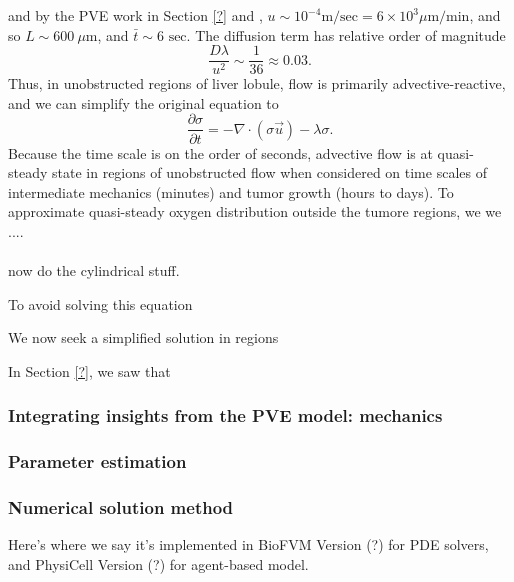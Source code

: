\documentclass[smallextended,natbib]{svjour3}
\newcommand{\beq}{\begin{equation}}
\newcommand{\eeq}{\end{equation}}
\newcommand{\micron}{\mu\textrm{m}}
\begin{document}
and by the PVE work in Section \ref{?} and \citep{nishii}, $u \sim 10^{-4} \textrm{m}/\textrm{sec} = 6 \times 10^3 \micron/\textrm{min}$, and so   
$L \sim 600\:\micron$, and 
$\bar{t} \sim 6 \textrm{ sec}$. The diffusion term has relative order of magnitude 
\beq
\frac{ D \lambda }{ u^2}  \sim \frac{1}{36} 	\approx 0.03. 
\eeq
Thus, in unobstructed regions of liver lobule, flow is primarily advective-reactive, and we can simplify the original equation  to 
\beq
\frac{ \partial \sigma }{ \partial t} = -\nabla \cdot \left( \sigma \vec{u} \right) - \lambda \sigma. 
\eeq
Because the time scale is on the order of seconds, advective flow is at quasi-steady state in regions of unobstructed flow 
when considered on time scales of intermediate mechanics (minutes) and tumor growth (hours to days). To approximate 
quasi-steady oxygen distribution outside the tumore regions, we we ....  \\ 
\\

now do the cylindrical stuff. 

To avoid solving this equation 

We now seek a simplified solution in regions 



In Section \ref{?}, we saw that 


\subsubsection{Integrating insights from the PVE model: mechanics}





\subsubsection{Parameter estimation}

\subsubsection{Numerical solution method} Here's where we say it's implemented in 
BioFVM Version (?) for PDE solvers, and PhysiCell Version (?) for agent-based model. 
\end{document}
